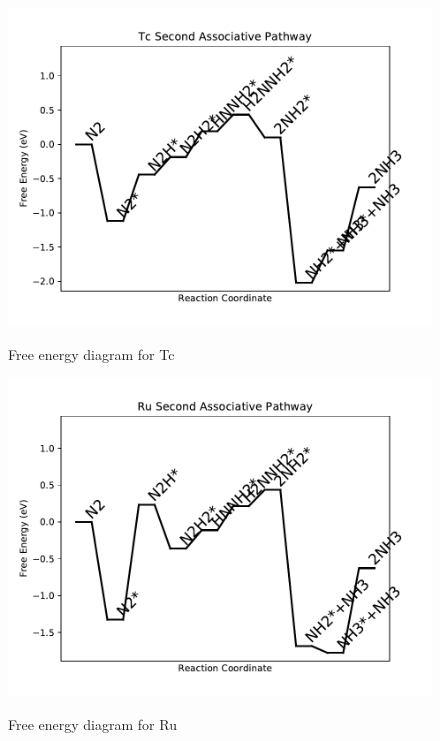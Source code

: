 \documentclass[journal=jacsat,manuscript=article]{achemso}
\begin{document}
\begin{figure}
\includegraphics[width=1\linewidth]{data/plots/Tc_associative_2.pdf}
\label{fig:Tc_associative_2}
\caption{Free energy diagram for Tc}
\end{figure}

\newpage
\begin{figure}
\includegraphics[width=1\linewidth]{data/plots/Ru_associative_2.pdf}
\label{fig:Ru_associative_2}
\caption{Free energy diagram for Ru}
\end{figure}
\end{document}
